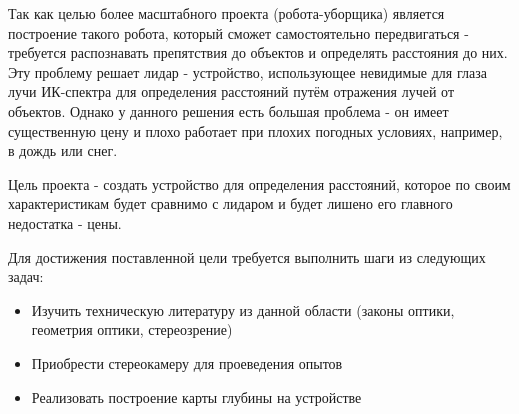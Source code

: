 
Так как целью более масштабного проекта (робота-уборщика) является построение такого робота, который сможет самостоятельно передвигаться - требуется распознавать препятствия до объектов и определять расстояния до них. Эту проблему решает лидар - устройство, использующее невидимые для глаза лучи ИК-спектра для определения расстояний путём отражения лучей от объектов. Однако у данного решения есть большая проблема - он имеет существенную цену и плохо работает при плохих погодных условиях, например, в дождь или снег.

Цель проекта - создать устройство для определения расстояний, которое по своим характеристикам будет сравнимо с лидаром и будет лишено его главного недостатка - цены.

Для достижения поставленной цели требуется выполнить шаги из следующих задач:
\begin{itemize}
    \item Изучить техническую литературу из данной области (законы оптики, геометрия оптики, стереозрение)
    \item Приобрести стереокамеру для проеведения опытов
    \item Реализовать построение карты глубины на устройстве
\end{itemize}
